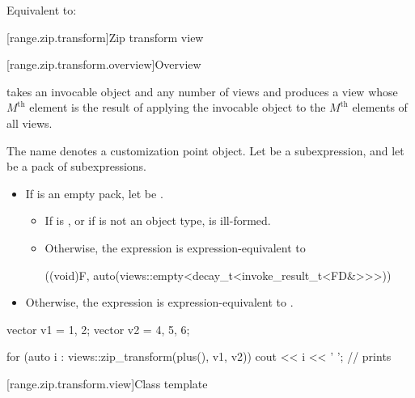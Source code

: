 \begin{itemdescr}
\pnum
\effects
Equivalent to: 
\end{itemdescr}

[range.zip.transform]{Zip transform view}

[range.zip.transform.overview]{Overview}

\pnum
{}%
 takes an invocable object and
any number of views and
produces a view
whose $M^\text{th}$ element is
the result of applying the invocable object
to the $M^\text{th}$ elements of all views.

\pnum
{}%
The name  denotes
a customization point object.
Let  be a subexpression, and
let  be a pack of subexpressions.
\begin{itemize}
\item
If  is an empty pack,
let  be .
\begin{itemize}
\item
If  is , or
if  is not an object type,
 is ill-formed.
\item
Otherwise, the expression 
is expression-equivalent to
\begin{codeblock}
((void)F, auto(views::empty<decay_t<invoke_result_t<FD&>>>))
\end{codeblock}
\end{itemize}
\item
Otherwise, the expression 
is expression-equivalent to .
\end{itemize}

\pnum
\begin{example}
\begin{codeblock}
vector v1 = {1, 2};
vector v2 = {4, 5, 6};

for (auto i : views::zip_transform(plus(), v1, v2)) {
  cout << i << ' ';     // prints 
}
\end{codeblock}
\end{example}

[range.zip.transform.view]{Class template }

